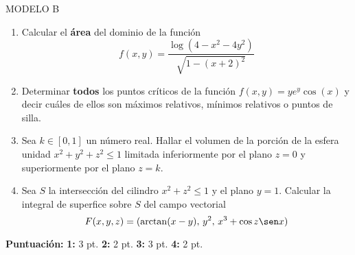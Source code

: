 \documentclass[a4paper, 12pt]{article}
\begin{document}
MODELO B
\vskip 5mm
\begin{enumerate}
\item
Calcular el {\bf área} del dominio de la función
$$
f(x,y)=\frac{\log(4-x^2-4y^2)}{\sqrt{1-(x+2)^2}}
$$
\vskip 25mm

\item
Determinar {\bf todos} los puntos críticos de la función
$
f(x,y)=y e^y \cos(x)
$
y decir cuáles de ellos son máximos relativos, mínimos relativos o puntos de silla.
\vskip 25mm
 
 
\item
Sea $k\in[0,1]$ un número real.
Hallar el volumen de la porción de la esfera unidad $x^2+y^2+z^2\le1$ limitada inferiormente por el plano $z=0$ y superiormente por el plano $z=k$.
\vskip 25mm


\item
Sea $S$ la intersección del cilindro $x^2+z^2\le1$ y el plano $y=1$. Calcular la integral de superfice sobre $S$ del campo vectorial
$$
F(x,y,z)=(\arctan(x-y), \, y^2, \, x^3+\cos z \sen x)
$$
\vskip 25mm

\end{enumerate}

\vfill
\normalsize
\noindent
{\bf Puntuación:}
\hskip 10mm
{\bf 1:} 3 pt. \hskip 16mm 
{\bf 2:} 2 pt. \hskip 16mm
{\bf 3:} 3 pt. \hskip 16mm
{\bf 4:} 2 pt.
\end{document}
